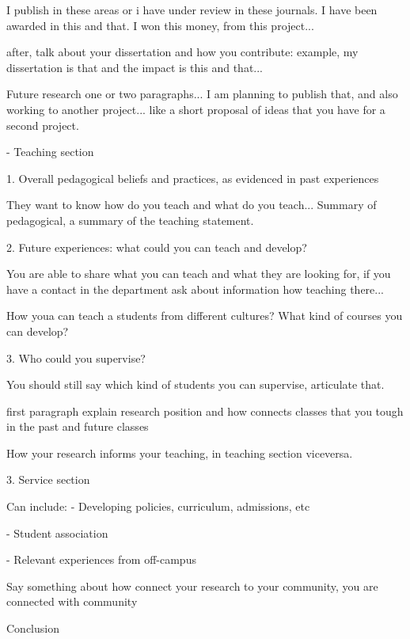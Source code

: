 I publish in these areas or i have under review in these journals. I have been awarded in this and that. I won this money, from this project...

after, talk about your dissertation and how you contribute:
example, my dissertation is that and the impact is this and that...

Future research one or two paragraphs... I am planning to publish that, and also working to another project... like a short proposal of ideas that you have for a second project.


- Teaching section

1. Overall pedagogical beliefs and practices, as evidenced in past experiences

They want to know how do you teach and what do you teach... Summary of pedagogical, a summary of the teaching statement.

2. Future experiences: what could you can teach and develop?

You are able to share what you can teach and what they are looking for, if you have a contact in the department ask about information how teaching there... 

How youa can teach a students from different cultures? What kind of courses you can develop? 

3. Who could you supervise?

You should still say which kind of students you can supervise, articulate that.


first paragraph explain research position and how connects
classes that you tough in the past
and future classes 

How your research informs your teaching, in teaching section viceversa.


3. Service section

Can include:
- Developing policies, curriculum, admissions, etc

- Student association

- Relevant experiences from off-campus

Say something about how connect your research to your community, you are connected with community





Conclusion

